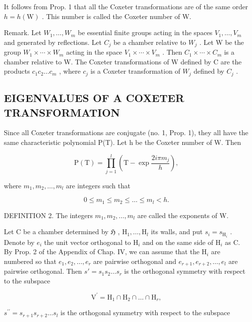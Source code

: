 It follows from Prop. 1 that all the Coxeter transformations are of the same order \(h = h(\mathrm{W})\) . This number is called the Coxeter number of W.

Remark. Let \(W_{1},\ldots,W_{m}\) be essential finite groups acting in the spaces \(V_{1},\ldots,V_{m}\) and generated by reflections. Let \(C_{j}\) be a chamber relative to \(W_{j}\) . Let W be the group \(W_{1}\times\cdots\times W_{m}\) acting in the space \(V_{1}\times\cdots\times V_{m}\) . Then \(C_{1}\times\cdots\times C_{m}\) is a chamber relative to W. The Coxeter transformations of W defined by C are the products \(c_{1}c_{2}\ldots c_{m}\) , where \(c_{j}\) is a Coxeter transformation of \(W_{j}\) defined by \(C_{j}\) .

\subsection{EIGENVALUES OF A COXETER TRANSFORMATION}

Since all Coxeter transformations are conjugate (no. 1, Prop. 1), they all have the same characteristic polynomial P(T). Let h be the Coxeter number of W. Then

\[
\mathrm{P} (\mathrm{T}) = \prod_ {j = 1} ^ {l} \left(\mathrm{T} - \exp \frac {2 i \pi m _ {j}}{h}\right),
\]

where \(m_{1}, m_{2}, \ldots, m_{l}\) are integers such that

\[
0 \leqslant m _ {1} \leqslant m _ {2} \leqslant \dots \leqslant m _ {l} <   h.
\]

DEFINITION 2. The integers \(m_1, m_2, \ldots, m_l\) are called the exponents of W.

Let C be a chamber determined by \(\mathfrak{H}\) , \(\mathrm{H}_1, \ldots, \mathrm{H}_l\) its walls, and put \(s_i = s_{\mathrm{H}_i}\) . Denote by \(e_i\) the unit vector orthogonal to \(\mathrm{H}_i\) and on the same side of \(\mathrm{H}_i\) as C. By Prop. 2 of the Appendix of Chap. IV, we can assume that the \(\mathrm{H}_i\) are numbered so that \(e_1, e_2, \ldots, e_r\) are pairwise orthogonal and \(e_{r+1}, e_{r+2}, \ldots, e_l\) are pairwise orthogonal. Then \(s' = s_1 s_2 \ldots s_r\) is the orthogonal symmetry with respect to the subspace

\[
\mathrm{V} ^ {\prime} = \mathrm{H} _ {1} \cap \mathrm{H} _ {2} \cap \dots \cap \mathrm{H} _ {r},
\]

\(s^{\prime \prime} = s_{r + 1}s_{r + 2}\dots s_{l}\) is the orthogonal symmetry with respect to the subspace


